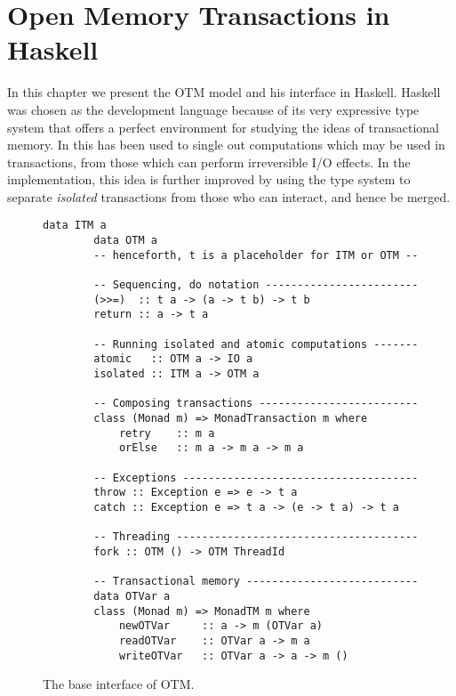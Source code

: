 
\chapter{Open Memory Transactions in Haskell}
\label{chap:otm}
In this chapter we present the OTM model and his interface in Haskell.
Haskell was chosen as the development language because of its very expressive type system that offers a perfect environment for studying the ideas of transactional memory.
In \cite{Harris:2005:CMT:1065944.1065952} this has been used to single out computations which may be used in transactions, from those which can perform irreversible I/O effects. 
In the implementation, this idea is further improved by using the type system to separate \emph{isolated} transactions from those who can interact, and hence be merged.

\begin{figure}
    \centering
    \begin{Verbatim}[tabsize=3, gobble=2]
        data ITM a
        data OTM a
        -- henceforth, t is a placeholder for ITM or OTM --
        
        -- Sequencing, do notation ------------------------
        (>>=)  :: t a -> (a -> t b) -> t b
        return :: a -> t a
        
        -- Running isolated and atomic computations -------
        atomic   :: OTM a -> IO a
        isolated :: ITM a -> OTM a
        
        -- Composing transactions -------------------------
        class (Monad m) => MonadTransaction m where
            retry    :: m a
            orElse   :: m a -> m a -> m a
        
        -- Exceptions -------------------------------------
        throw :: Exception e => e -> t a
        catch :: Exception e => t a -> (e -> t a) -> t a
        
        -- Threading --------------------------------------
        fork :: OTM () -> OTM ThreadId
        
        -- Transactional memory ---------------------------
        data OTVar a
        class (Monad m) => MonadTM m where
            newOTVar     :: a -> m (OTVar a)
            readOTVar    :: OTVar a -> m a
            writeOTVar   :: OTVar a -> a -> m ()

    \end{Verbatim}
    \caption{The base interface of OTM.}
    \label{fig:base-interface}
\end{figure}

